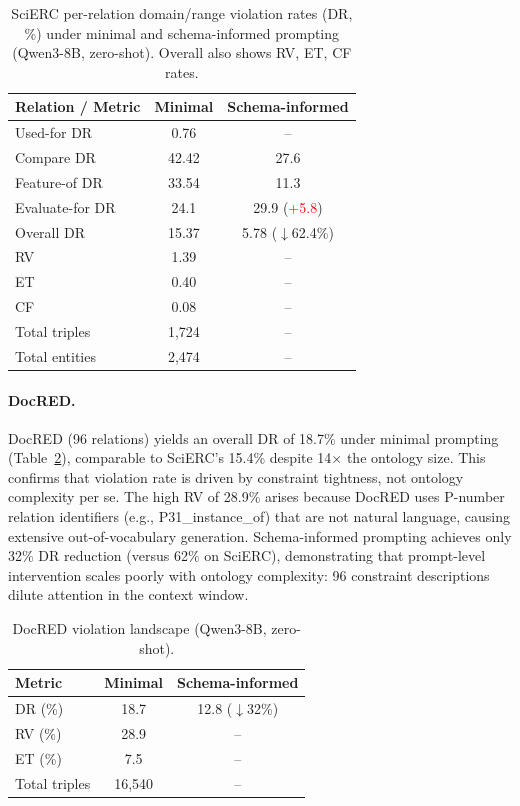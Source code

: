 \documentclass[11pt,a4paper]{article}
\newcommand{\drsym}{\textsc{DR}}
\newcommand{\rvsym}{\textsc{RV}}
\newcommand{\etsym}{\textsc{ET}}
\newcommand{\cfsym}{\textsc{CF}}
\begin{document}
\begin{table}[t]
\centering
\caption{SciERC per-relation domain/range violation rates (\drsym{}, \%) under minimal and schema-informed prompting (Qwen3-8B, zero-shot). Overall also shows \rvsym{}, \etsym{}, \cfsym{} rates.}
\label{tab:scierc-phase0}
\small
\begin{tabular}{lcc}
\toprule
\textbf{Relation / Metric} & \textbf{Minimal} & \textbf{Schema-informed} \\
\midrule
Used-for \drsym{} & 0.76 & -- \\
Compare \drsym{} & 42.42 & 27.6 \\
Feature-of \drsym{} & 33.54 & 11.3 \\
Evaluate-for \drsym{} & 24.1 & 29.9 (\textcolor{red}{+5.8}) \\
\midrule
Overall \drsym{} & 15.37 & 5.78 ($\downarrow$62.4\%) \\
\rvsym{} & 1.39 & -- \\
\etsym{} & 0.40 & -- \\
\cfsym{} & 0.08 & -- \\
\midrule
Total triples & 1,724 & -- \\
Total entities & 2,474 & -- \\
\bottomrule
\end{tabular}
\end{table}

\paragraph{DocRED.}
DocRED (96 relations) yields an overall \drsym{} of 18.7\% under minimal prompting (Table~\ref{tab:docred-phase0}), comparable to SciERC's 15.4\% despite 14$\times$ the ontology size. This confirms that violation rate is driven by constraint tightness, not ontology complexity per se. The high \rvsym{} of 28.9\% arises because DocRED uses P-number relation identifiers (e.g., P31\_instance\_of) that are not natural language, causing extensive out-of-vocabulary generation. Schema-informed prompting achieves only 32\% \drsym{} reduction (versus 62\% on SciERC), demonstrating that prompt-level intervention scales poorly with ontology complexity: 96 constraint descriptions dilute attention in the context window.

\begin{table}[t]
\centering
\caption{DocRED violation landscape (Qwen3-8B, zero-shot).}
\label{tab:docred-phase0}
\small
\begin{tabular}{lcc}
\toprule
\textbf{Metric} & \textbf{Minimal} & \textbf{Schema-informed} \\
\midrule
\drsym{} (\%) & 18.7 & 12.8 ($\downarrow$32\%) \\
\rvsym{} (\%) & 28.9 & -- \\
\etsym{} (\%) & 7.5 & -- \\
Total triples & 16,540 & -- \\
\bottomrule
\end{tabular}
\end{table}
\end{document}
